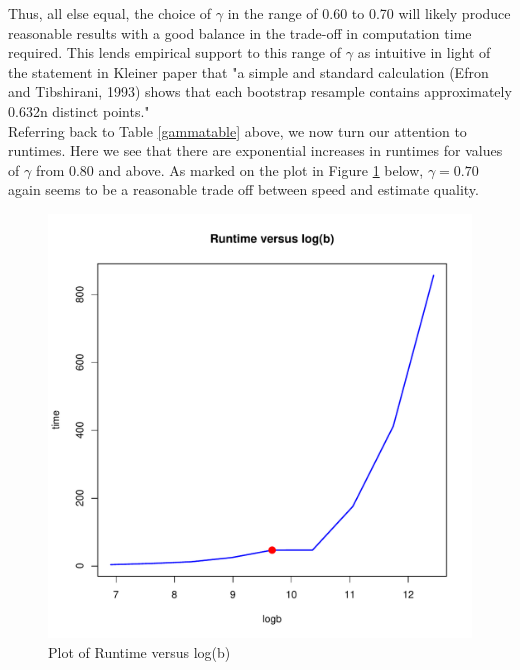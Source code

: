 \documentclass[a4paper, 11pt]{report}
\begin{document}
\begin{enumerate}
		    Thus, all else equal, the choice of $\gamma$ in the range of 0.60 to 0.70 will likely produce reasonable results with a good balance in the trade-off in computation time required.  This lends empirical support to this range of $\gamma$ as intuitive in light of the statement in Kleiner paper that "a simple and standard calculation (Efron and Tibshirani, 1993) shows that each bootstrap resample contains approximately 0.632n distinct points." \\
	    
	    	Referring back to Table \ref{gammatable} above, we now turn our attention to runtimes.  Here we see that there are exponential increases in runtimes for values of $\gamma$ from 0.80 and above.  As marked on the plot in Figure \ref{runtimes} below, $\gamma=0.70$ again seems to be a reasonable trade off between speed and estimate quality.
			\begin{figure}[H]
				\centering
				\includegraphics[scale=0.50]{runtimes.pdf}					
				\caption{Plot of Runtime versus log(b)}
				\label{runtimes}
			\end{figure} 
	    	

\end{enumerate}
\end{document}
